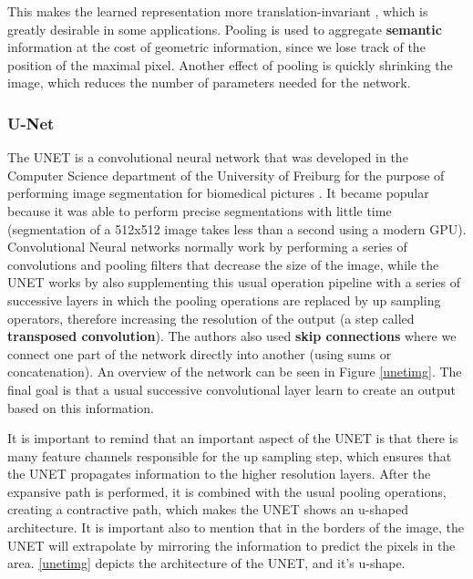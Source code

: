 This makes the learned representation more translation-invariant \cite{dlbook}, which is greatly desirable in some applications. Pooling is used to aggregate \textbf{semantic} information at the cost of geometric information, since we lose track of the position of the maximal pixel. Another effect of pooling is quickly shrinking the image, which reduces the number of parameters needed for the network.

\subsubsection{U-Net}

The UNET is a convolutional neural network that was developed in the Computer Science department of the University of Freiburg for the purpose of performing image segmentation for
biomedical pictures \cite{Unet}. It became popular because it was able to perform precise segmentations with little time (segmentation of a 512x512 image takes less than a second using a modern GPU).
Convolutional Neural networks normally work by performing a series of convolutions and pooling filters that decrease the size of the image, while the UNET works by also 
supplementing this usual operation pipeline with a series of successive layers in which the pooling operations are replaced by up sampling operators, therefore increasing the resolution of the output (a step called \textbf{transposed convolution}).
The authors also used \textbf{skip connections} where we connect one part of the network directly into another (using sums or concatenation). An overview of the network can be seen in Figure \ref{unetimg}.
The final goal is that a usual successive convolutional layer learn to create an output based on this information. 

It is important to remind that an important aspect of the UNET is that there is many feature channels responsible for the up sampling step, which ensures that the UNET propagates information
to the higher resolution layers. After the expansive path is performed, it is combined with the usual pooling operations, creating a contractive path, which makes the UNET shows an u-shaped architecture. 
It is important also to mention that in the borders of the image, the UNET will extrapolate by mirroring the information to predict the pixels in the area. 
\ref{unetimg} depicts the architecture of the UNET, and it's u-shape.

